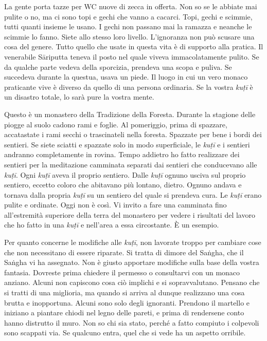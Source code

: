 La gente porta tazze per WC nuove di zecca in offerta. Non so se le
abbiate mai pulite o no, ma ci sono topi e gechi che vanno a cacarci.
Topi, gechi e scimmie, tutti quanti insieme le usano. I gechi non
passano mai la ramazza e neanche le scimmie lo fanno. Siete allo stesso
loro livello. L'ignoranza non può scusare una cosa del genere. Tutto
quello che usate in questa vita è di supporto alla pratica. Il
venerabile Sāriputta teneva il posto nel quale viveva immacolatamente
pulito. Se da qualche parte vedeva della sporcizia, prendeva una scopa e
puliva. Se succedeva durante la questua, usava un piede. Il luogo in cui
un vero monaco praticante vive è diverso da quello di una persona
ordinaria. Se la vostra \emph{kuṭī} è un disastro totale, lo sarà pure
la vostra mente.

Questo è un monastero della Tradizione della Foresta. Durante la
stagione delle piogge al suolo cadono rami e foglie. Al pomeriggio,
prima di spazzare, accatastate i rami secchi o trascinateli nella
foresta. Spazzate per bene i bordi dei sentieri. Se siete sciatti e
spazzate solo in modo superficiale, le \emph{kuṭī} e i sentieri andranno
completamente in rovina. Tempo addietro ho fatto realizzare dei sentieri
per la meditazione camminata separati dai sentieri che conducevano alle
\emph{kuṭī}. Ogni \emph{kuṭī} aveva il proprio sentiero. Dalle
\emph{kuṭī} ognuno usciva sul proprio sentiero, eccetto coloro che
abitavano più lontano, dietro. Ognuno andava e tornava dalla propria
\emph{kuṭī} su un sentiero del quale si prendeva cura. Le \emph{kuṭī}
erano pulite e ordinate. Oggi non è così. Vi invito a fare una camminata
fino all'estremità superiore della terra del monastero per vedere i
risultati del lavoro che ho fatto in una \emph{kuṭī} e nell'area a essa
circostante. È un esempio.

Per quanto concerne le modifiche alle \emph{kuṭī}, non lavorate troppo
per cambiare cose che non necessitano di essere riparate. Si tratta di
dimore del Saṅgha, che il Saṅgha vi ha assegnato. Non è giusto apportare
modifiche sulla base della vostra fantasia. Dovreste prima chiedere il
permesso o consultarvi con un monaco anziano. Alcuni non capiscono cosa
ciò implichi e si sopravvalutano. Pensano che si tratti di una
miglioria, ma quando si arriva al dunque realizzano una cosa brutta e
inopportuna. Alcuni sono solo degli ignoranti. Prendono il martello e
iniziano a piantare chiodi nel legno delle pareti, e prima di rendersene
conto hanno distrutto il muro. Non so chi sia stato, perché a fatto
compiuto i colpevoli sono scappati via. Se qualcuno entra, quel che si
vede ha un aspetto orribile.

